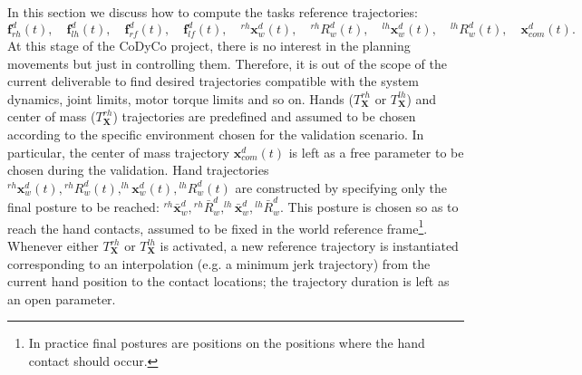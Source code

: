 \documentclass[12pt,a4paper,twoside]{article}
\begin{document}
In this section we discuss how to compute the tasks reference trajectories:
$$
{\bm f}^d_{rh} (t), \quad{\bm f}^d_{lh}(t), \quad {\bm f}^d_{rf}(t),  \quad {\bm f}^d_{lf}(t), \quad ^{rh}{ {\bm x}}^d_w(t), \quad {}^{rh}{ {R}}_w^d(t) , \quad ^{lh}{ {\bm x}}^d_w(t), \quad {}^{lh}{ {R}}_w^d(t), \quad {\bm x}^d_{com}(t).
$$
At this stage of the CoDyCo project, there is no interest in the planning movements but just in controlling them. Therefore, it is out of the scope of the current deliverable to find desired trajectories compatible with the system dynamics, joint limits, motor torque limits and so on. Hands ($T^{rh}_{\bm X}$ or $T^{lh}_{\bm X}$) and center of mass ($T^{rh}_{\bm X}$) trajectories are predefined and assumed to be chosen according to the specific environment chosen for the validation scenario. In particular, the center of mass trajectory ${\bm x}^d_{com}(t)$ is left as a free parameter to be chosen during the validation. Hand trajectories $^{rh}{ {\bm x}}^d_w(t), {}^{rh}{ {R}}_w^d(t), ^{lh}{ {\bm x}}^d_w(t), {}^{lh}{ {R}}_w^d(t)$ are constructed by specifying only the final posture to be reached: $^{rh}{ {\bar{\bm x}}}^d_w, {}^{rh}{ {\bar R}}_w^d, ^{lh}{ \bar{\bm x}}^d_w, {}^{lh}{ \bar {R}}_w^d$. This posture is chosen so as to reach the hand contacts, assumed to be fixed in the world reference frame\footnote{In practice final postures are positions on the positions where the hand contact should occur.}. Whenever either $T^{rh}_{\bm X}$ or $T^{lh}_{\bm X}$ is activated, a new reference trajectory is instantiated corresponding to an interpolation (e.g. a minimum jerk trajectory) from the current hand position to the contact locations; the trajectory duration is left as an open parameter. 
\end{document}
